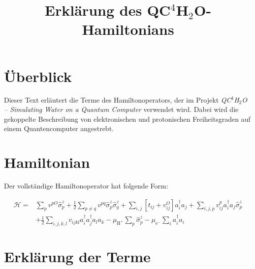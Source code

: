 \documentclass[12pt]{article}
\title{\textbf{Erklärung des QC$^4$H$_2$O-Hamiltonians}}
\author{}
\date{}
\begin{document}
	
	\maketitle
	
	\section*{Überblick}
	
	Dieser Text erläutert die Terme des Hamiltonoperators, der im Projekt \textit{QC$^4$H$_2$O – Simulating Water on a Quantum Computer} verwendet wird. Dabei wird die gekoppelte Beschreibung von elektronischen und protonischen Freiheitsgraden auf einem Quantencomputer angestrebt.
	
	\section*{Hamiltonian}
	
	Der vollständige Hamiltonoperator hat folgende Form:
	
	\begin{align}
		\mathcal{H} = & \sum_p v^{pO} \hat{\sigma}_p^z
		+ \frac{1}{2} \sum_{p \neq q} v^{pq} \hat{\sigma}_p^z \hat{\sigma}_q^z
		+ \sum_{i,j} \left[t_{ij} + v_{ij}^O \right] a_i^\dagger a_j
		+ \sum_{i,j,p} v_{ij}^p a_i^\dagger a_j \hat{\sigma}_p^z \nonumber \\
		& + \frac{1}{2} \sum_{i,j,k,l} v_{ijkl} a_i^\dagger a_j^\dagger a_l a_k
		- \mu_{\mathrm{H}^{+}} \sum_p \hat{\sigma}_p^z
		- \mu_{\mathrm{e}^{-}} \sum_i a_i^\dagger a_i
	\end{align}
	
	\section*{Erklärung der Terme}
	
\end{document}
